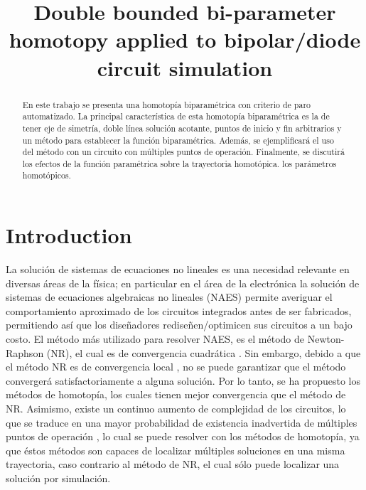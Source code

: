 \documentclass[conference,letterpaper,twocolumn]{IEEEtran}
\begin{document}
\title{Double bounded bi-parameter homotopy applied to bipolar/diode circuit simulation}

\author{
\and
{}
}

\maketitle

\begin{abstract}

En este trabajo se presenta una homotopía biparam\'etrica con criterio de paro automatizado.
La principal característica de esta homotopía biparam\'etrica es la de tener eje de simetría, doble l{\'i}nea
solución acotante, puntos de inicio y fin arbitrarios y un método para establecer la función biparam\'etrica.  
Además, se ejemplificará el uso del método con un circuito con múltiples puntos de operación.
Finalmente, se discutirá los efectos de la función paramétrica sobre la trayectoria homotópica.
los parámetros homotópicos.
\end{abstract}
 

\section{Introduction} 

La solución de sistemas de ecuaciones no lineales es una necesidad relevante en diversas áreas de la física; en particular 
en el área de la electrónica la solución de sistemas  de ecuaciones algebraicas no lineales (NAES) permite averiguar el
comportamiento aproximado de los circuitos integrados  antes de ser fabricados, permitiendo así que los diseñadores
rediseñen/optimicen sus circuitos a un bajo costo. El método más utilizado para resolver NAES, es el método de Newton-Raphson (NR), el cual
es de convergencia cuadrática \cite{homo_ogrodzki,cont_quasi}. Sin embargo, debido a que el método NR es de convergencia local \cite{cont_quasi,Schwa_book}, no se puede garantizar que
el método convergerá satisfactoriamente a alguna solución.  Por lo tanto, se ha propuesto los métodos de homotopía, los cuales
tienen mejor convergencia que el método de NR. Asimismo, existe un continuo aumento de complejidad de los circuitos, 
lo que se traduce en una mayor probabilidad de existencia inadvertida de múltiples puntos de operación \cite{netwth_4q}, lo cual
se puede resolver con los métodos de homotopía, ya que éstos métodos son capaces de localizar múltiples soluciones en una misma trayectoria, caso contrario al método de NR, el cual sólo puede localizar una solución por simulación.
\end{document}
